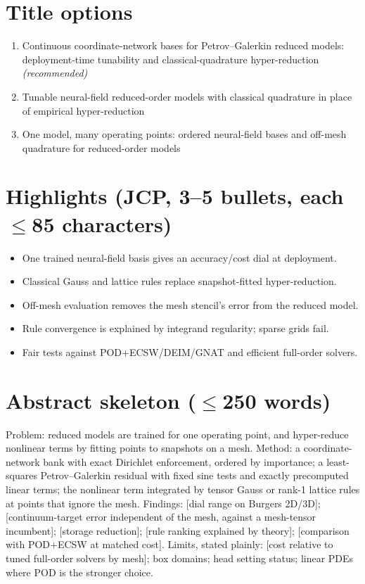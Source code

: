 \documentclass[11pt]{article}
\begin{document}
\section*{Title options}
\begin{enumerate}
\item Continuous coordinate-network bases for Petrov--Galerkin reduced models: deployment-time tunability and classical-quadrature hyper-reduction \emph{(recommended)}
\item Tunable neural-field reduced-order models with classical quadrature in place of empirical hyper-reduction
\item One model, many operating points: ordered neural-field bases and off-mesh quadrature for reduced-order models
\end{enumerate}

\section*{Highlights (JCP, 3--5 bullets, each $\le$85 characters)}
\begin{itemize}
\item One trained neural-field basis gives an accuracy/cost dial at deployment.
\item Classical Gauss and lattice rules replace snapshot-fitted hyper-reduction.
\item Off-mesh evaluation removes the mesh stencil's error from the reduced model.
\item Rule convergence is explained by integrand regularity; sparse grids fail.
\item Fair tests against POD+ECSW/DEIM/GNAT and efficient full-order solvers.
\end{itemize}

\section*{Abstract skeleton ($\le$250 words)}
Problem: reduced models are trained for one operating point, and hyper-reduce nonlinear terms
by fitting points to snapshots on a mesh.
Method: a coordinate-network bank with exact Dirichlet enforcement, ordered by importance; a
least-squares Petrov--Galerkin residual with fixed sine tests and exactly precomputed linear
terms; the nonlinear term integrated by tensor Gauss or rank-1 lattice rules at points that ignore the mesh.
Findings: [dial range on Burgers 2D/3D]; [continuum-target error independent of the mesh, against a mesh-tensor incumbent];
[storage reduction]; [rule ranking explained by theory]; [comparison with POD+ECSW at matched cost].
Limits, stated plainly: [cost relative to tuned full-order solvers by mesh]; box domains; head setting status; linear PDEs where POD is the stronger choice.
\end{document}

